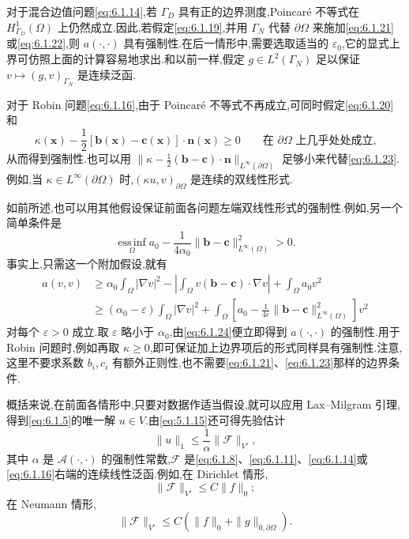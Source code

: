 对于混合边值问题\eqref{eq:6.1.14},若 \(\Gamma_D\) 具有正的边界测度,Poincaré 不等式在 \(H^1_{\Gamma_D}(\Omega)\) 上仍然成立.因此,若假定\eqref{eq:6.1.19},并用 \(\Gamma_N\) 代替 \(\partial\Omega\) 来施加\eqref{eq:6.1.21}或\eqref{eq:6.1.22},则 \(a(\cdot,\cdot)\) 具有强制性.在后一情形中,需要选取适当的 \(\varepsilon_0\),它的显式上界可仿照上面的计算容易地求出.和以前一样,假定 \(g\in L^2(\Gamma_N)\) 足以保证 \(v\mapsto(g,v)_{\Gamma_N}\) 是连续泛函.

对于 Robin 问题\eqref{eq:6.1.16},由于 Poincaré 不等式不再成立,可同时假定\eqref{eq:6.1.20}和
\begin{equation}\label{eq:6.1.23}
  \kappa(\boldsymbol{x})-\frac12[\boldsymbol{b}(\boldsymbol{x})-\boldsymbol{c}(\boldsymbol{x})]
                   \cdot\boldsymbol{n}(\boldsymbol{x})\ge0
  \qquad\text{在 \(\partial\Omega\) 上几乎处处成立,}
\end{equation}
从而得到强制性.也可以用 \(\|\kappa-\frac12(\boldsymbol{b}-\boldsymbol{c})\cdot\boldsymbol{n}\|_{L^\infty(\partial\Omega)}\) 足够小来代替\eqref{eq:6.1.23}.例如,当 \(\kappa\in L^\infty(\partial\Omega)\) 时,\((\kappa u,v)_{\partial\Omega}\) 是连续的双线性形式.

如前所述,也可以用其他假设保证前面各问题左端双线性形式的强制性.例如,另一个简单条件是
\begin{equation}\label{eq:6.1.24}
  \operatorname*{ess\,inf}_{\Omega}a_0-\frac{1}{4\alpha_0}
      \|\boldsymbol{b}-\boldsymbol{c}\|_{L^\infty(\Omega)}^2>0.
\end{equation}
事实上,只需这一个附加假设,就有
\[
  \begin{aligned}
    a(v,v)
    &\ge\alpha_0\int_\Omega|\nabla v|^2
      -\left|\int_\Omega v(\boldsymbol{b}-\boldsymbol{c})\cdot\nabla v\right|
      +\int_\Omega a_0v^2\\
    &\ge(\alpha_0-\varepsilon)\int_\Omega|\nabla v|^2
      +\int_\Omega\left[a_0-\frac1{4\varepsilon}
                        \|\boldsymbol{b}-\boldsymbol{c}\|_{L^\infty(\Omega)}^2\right]v^2
  \end{aligned}
\]
对每个 \(\varepsilon>0\) 成立.取 \(\varepsilon\) 略小于 \(\alpha_0\),由\eqref{eq:6.1.24}便立即得到 \(a(\cdot,\cdot)\) 的强制性.用于 Robin 问题时,例如再取 \(\kappa\ge0\),即可保证加上边界项后的形式同样具有强制性.注意,这里不要求系数 \(b_i,c_i\) 有额外正则性,也不需要\eqref{eq:6.1.21}、\eqref{eq:6.1.23}那样的边界条件.

概括来说,在前面各情形中,只要对数据作适当假设,就可以应用 Lax--Milgram 引理,得到\eqref{eq:6.1.5}的唯一解 \(u\in V\).由\eqref{eq:5.1.15}还可得先验估计
\begin{equation}\label{eq:6.1.25}
  \|u\|_1\le\frac1\alpha\|\mathcal F\|_{V'},
\end{equation}
其中 \(\alpha\) 是 \(\mathcal A(\cdot,\cdot)\) 的强制性常数,\(\mathcal F\) 是\eqref{eq:6.1.8}、\eqref{eq:6.1.11}、\eqref{eq:6.1.14}或\eqref{eq:6.1.16}右端的连续线性泛函.例如,在 Dirichlet 情形,
\begin{equation}\label{eq:6.1.26}
  \|\mathcal F\|_{V'}\le C\|f\|_0;
\end{equation}
在 Neumann 情形,
\begin{equation}\label{eq:6.1.27}
  \|\mathcal F\|_{V'}\le C(\|f\|_0+\|g\|_{0,\partial\Omega}).
\end{equation}


